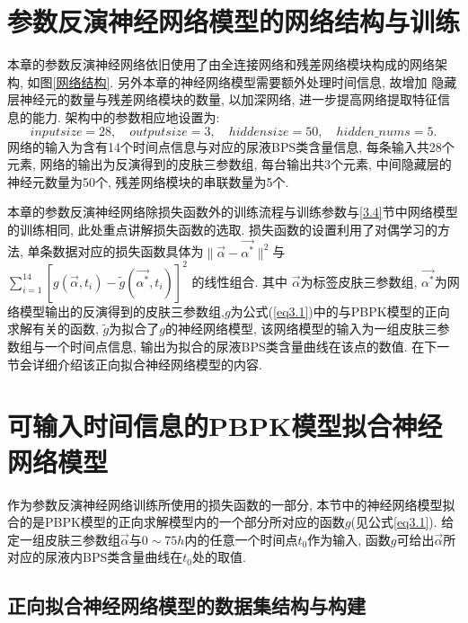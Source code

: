 \documentclass[a4paper,punct=banjiao,twoside]{ctexrep}
\theoremstyle{plain}
\theoremstyle{definition}
\theoremstyle{remark}
\begin{document}
\section{参数反演神经网络模型的网络结构与训练}
本章的参数反演神经网络依旧使用了由全连接网络和残差网络模块构成的网络架构, 如图\ref{网络结构}. 另外本章的神经网络模型需要额外处理时间信息, 故增加
隐藏层神经元的数量与残差网络模块的数量, 以加深网络, 进一步提高网络提取特征信息的能力.
架构中的参数相应地设置为:
$$
inputsize = 28,\quad outputsize = 3,\quad hiddensize = 50, \quad hidden\_nums = 5.
$$
\noindent 网络的输入为含有14个时间点信息与对应的尿液BPS类含量信息, 每条输入共28个元素, 网络的输出为反演得到的皮肤三参数组, 每台输出共3个元素, 
中间隐藏层的神经元数量为50个, 残差网络模块的串联数量为5个.

本章的参数反演神经网络除损失函数外的训练流程与训练参数与\ref{3.4}节中网络模型的训练相同, 此处重点讲解损失函数的选取.
损失函数的设置利用了对偶学习的方法, 单条数据对应的损失函数具体为$\|\vec{\alpha}-\vec{\alpha^*} \|^2$与
$\sum_{i = 1}^{14}  [g(\vec{\alpha}, t_i)-\tilde{g}(\vec{\alpha^*}, t_i) ]^2$
的线性组合.
其中
$\vec{\alpha}$为标签皮肤三参数组, $\vec{\alpha^*}$为网络模型输出的反演得到的皮肤三参数组,$g$为公式(\ref{eq3.1})中的与PBPK模型的正向求解有关的函数, 
$\tilde{g}$为拟合了$g$的神经网络模型, 该网络模型的输入为一组皮肤三参数组与一个时间点信息, 输出为拟合的尿液BPS类含量曲线在该点的数值. 在下一节会详细介绍该正向拟合神经网络模型的内容.


\section{可输入时间信息的PBPK模型拟合神经网络模型}

作为参数反演神经网络训练所使用的损失函数的一部分, 本节中的神经网络模型拟合的是PBPK模型的正向求解模型内的一个部分所对应的函数$g$(见公式\ref{eq3.1}).
给定一组皮肤三参数组$\vec{\alpha}$与$0 \sim 75h$内的任意一个时间点$t_0$作为输入, 函数$g$可给出$\vec{\alpha}$所对应的尿液内BPS类含量曲线在$t_0$处的取值.

\subsection*{正向拟合神经网络模型的数据集结构与构建}
\end{document}
